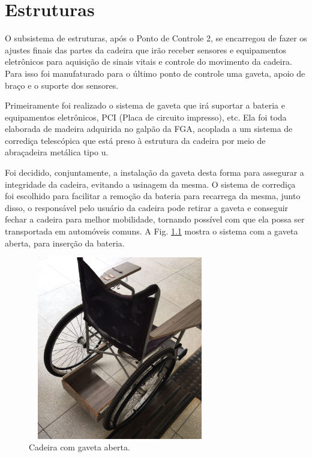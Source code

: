 \chapter{Estruturas}
\label{estrutura}

O subsistema de estruturas, após o Ponto de Controle 2, se encarregou de fazer os ajustes finais das partes da cadeira que irão receber sensores e equipamentos eletrônicos para aquisição de sinais vitais e controle do movimento da cadeira. Para isso foi manufaturado para o último ponto de controle uma gaveta, apoio de braço e o suporte dos sensores.

Primeiramente foi realizado o sistema de gaveta que irá suportar a bateria e equipamentos eletrônicos, PCI (Placa de circuito impresso), etc. Ela foi toda elaborada de madeira adquirida no galpão da FGA, acoplada a um sistema de corrediça telescópica que está preso à estrutura da cadeira por meio de abraçadeira metálica tipo u.

Foi decidido, conjuntamente, a instalação da gaveta desta forma para assegurar a integridade da cadeira, evitando a usinagem da mesma. O sistema de corrediça foi escolhido para facilitar a remoção da bateria para recarrega da mesma, junto disso, o responsável pelo usuário da cadeira pode retirar a gaveta e conseguir fechar a cadeira para melhor mobilidade, tornando possível com que ela possa ser transportada em automóveis comuns. A Fig. \ref{fig:gaveta_aberta} mostra o sistema com a gaveta aberta, para inserção da bateria.

\begin{figure}
    \begin{center}
        \includegraphics[width=8cm,height=8cm,keepaspectratio]{figuras/gaveta_aberta.png}
    \end{center}
    \caption{Cadeira com gaveta aberta.}
    \label{fig:gaveta_aberta}
\end{figure}

